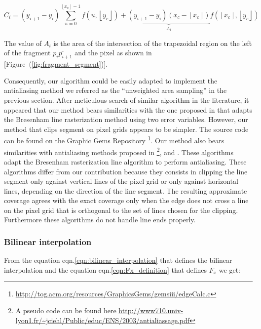\documentclass[11pt]{article}
\newcommand{\fig}[1]{[Figure~(#1)]}
\begin{document}
\begin{equation} 
C_i=(y_{i+1}-y_i)\sum_{u=0}^{\left\lfloor x_c\right\rfloor-1}f(u,\left\lfloor y_c\right\rfloor)+\underbrace{(y_{i+1}-y_i)(x_c-\left\lfloor x_c\right\rfloor)}_{A_i}f(\left\lfloor x_c\right\rfloor,\left\lfloor y_c\right\rfloor)
\end{equation}

The value of $A_i$ is the area of the intersection of the trapezoidal region on the left of the fragment $\overline{p_ip_{i+1}}$ and the pixel as shown in \fig{\ref{fig:fragment_segment}}.





Consequently, our algorithm could be easily adapted to implement the antialiasing method we referred as the ``unweighted area sampling'' in the previous section. After meticulous search of similar algorithm in the literature, it appeared that our method bears similarities with the one proposed in \cite{Cheng1992} that adapts the Bresenham \cite{Bresenham1965} line rasterization method using two error variables. However, our method that clips segment on pixel grids appears to be simpler. The source code can be found on the Graphic Gems Repository \footnote{\url{http://tog.acm.org/resources/GraphicsGems/gemsiii/edgeCalc.c}}. Our method also bears similarities with antialiasing methods proposed  in \cite{Pitteway1980} \footnote{A pseudo code can be found here \url{http://www710.univ-lyon1.fr/~jciehl/Public/educ/ENS/2003/antialiassage.pdf}},\cite{Wu1991} and \cite{Fujimoto1983}. These algorithms adapt the Bresenham \cite{Bresenham1965}  rasterization line algorithm to perform antialiasing. These algorithms differ from our contribution because they consists in clipping the line segment only against vertical lines of the pixel grid or only against horizontal lines, depending on the direction of the line segment. The resulting approximate coverage agrees with the exact coverage only when the edge does not cross a line on the pixel grid that is orthogonal to the set of lines chosen for the clipping. Furthermore these algorithms do not handle line ends properly. 

\subsubsection{Bilinear interpolation}

\label{sec:BilinearInterpolationIntegration}

From the equation eqn.\ref{eqn:bilinear_interpolation} that defines the bilinear interpolation and the equation eqn.\ref {eqn:Fx_definition} that defines $F_x$ we get:
    
\end{document}
